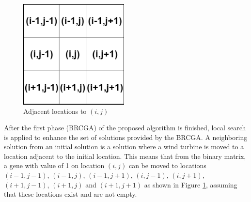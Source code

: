             \begin{figure}[h]
                \centering
                \includegraphics[width=55mm]{Figures/adjacentLoc.png}
                \caption{Adjacent locations to $(i,j)$}
                \label{adjacentLoc}
            \end{figure}
            
            After the first phase (BRCGA) of the proposed algorithm is finished, local search is applied to enhance the set of solutions provided by the BRCGA. A neighboring solution from an initial solution is a solution where a wind turbine is moved to a location adjacent to the initial location. This means that from the binary matrix, a gene with value of 1 on location $(i,j)$ can be moved to locations $(i-1,j-1)$, $(i-1,j)$, $(i-1,j+1)$, $(i,j-1)$, $(i,j+1)$, $(i+1,j-1)$, $(i+1,j)$ and $(i+1,j+1)$ as shown in Figure \ref{adjacentLoc}, assuming that these locations exist and are not empty.